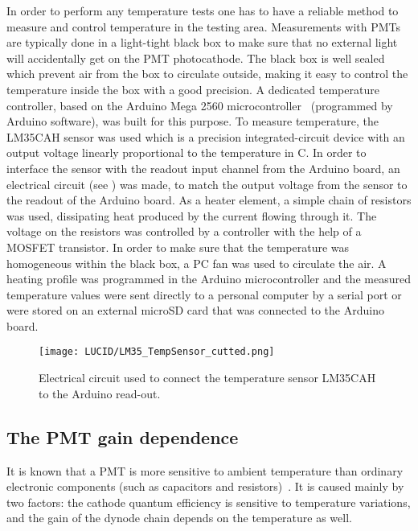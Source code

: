 In order to perform any temperature tests one has to have a reliable method to measure and control temperature in the testing area.
Measurements with PMTs are typically done in a light-tight black box to make sure that no external light will accidentally get on the PMT photocathode.
The black box is well sealed which prevent air from the box to circulate outside, making it easy to control the temperature inside the box with a good 
precision.
A dedicated temperature controller, based on the Arduino Mega 2560 microcontroller~\cite{arduino} (programmed by Arduino software), was built for this purpose.
To measure temperature, the LM35CAH sensor was used which is a precision integrated-circuit device with an output voltage linearly proportional to the 
temperature in \degree C.
In order to interface the sensor with the readout input channel from the Arduino board, an electrical circuit 
(see ) was made, 
to match the output voltage from the sensor to the readout of the Arduino board.
As a heater element, a simple chain of resistors was used, dissipating heat produced by the current flowing through it. 
The voltage on the resistors was controlled by a controller with the help of a MOSFET transistor. 
In order to make sure that the temperature was homogeneous within the black box,
a PC fan was used to circulate the air. A heating profile was programmed in the Arduino microcontroller and 
the measured temperature values were sent directly to a personal computer by a serial port or were stored on an external microSD card 
that was connected to the Arduino board.
 
\begin{figure}
\centering
\texttt{[image: LUCID/LM35\_TempSensor\_cutted.png]}
\caption{Electrical circuit used to connect the temperature sensor LM35CAH to the Arduino read-out.}
\label{fig:tempReadOutCircuit}
\end{figure}
 
\subsection{The PMT gain dependence}
\label{subsec:pmtGainTempDep}

It is known that a PMT is more sensitive to ambient temperature than ordinary 
electronic components (such as capacitors and resistors)~\cite{hamamatsu}.
It is caused mainly by two factors: the cathode quantum efficiency is sensitive to 
temperature variations, and the gain of the dynode chain depends on the temperature as well.

